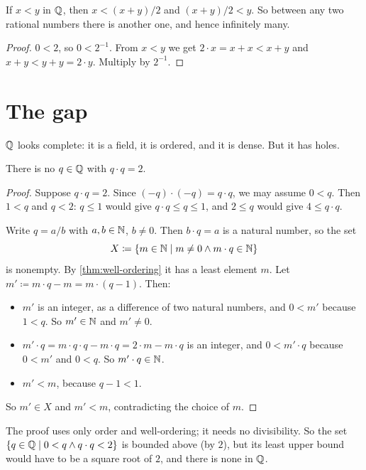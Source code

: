 \begin{theorem}[Density]
\label{thm:density}
If $x < y$ in $\mathbb{Q}$, then $x < (x + y) / 2$ and $(x + y) / 2 < y$. So between any two
rational numbers there is another one, and hence infinitely many.
\end{theorem}

\begin{proof}
$0 < 2$, so $0 < 2^{-1}$. From $x < y$ we get $2 \cdot x = x + x < x + y$ and $x + y
< y + y = 2 \cdot y$. Multiply by $2^{-1}$.
\end{proof}

\section{The gap}

$\mathbb{Q}$ looks complete: it is a field, it is ordered, and it is dense. But it has
holes.

\begin{theorem}
\label{thm:sqrt2}
There is no $q \in \mathbb{Q}$ with $q \cdot q = 2$.
\end{theorem}

\begin{proof}
Suppose $q \cdot q = 2$. Since $(-q) \cdot (-q) = q \cdot q$, we may assume $0 <
q$. Then $1 < q$ and $q < 2$: $q \le 1$ would give $q \cdot q \le q \le 1$, and $2
\le q$ would give $4 \le q \cdot q$.

Write $q = a / b$ with $a, b \in \mathbb{N}$, $b \neq 0$. Then $b \cdot q = a$ is a natural
number, so the set
\[
  X \coloneqq \lbrace m \in \mathbb{N} \mid m \neq 0 \land m \cdot q \in \mathbb{N} \rbrace
\]
is nonempty. By \cref{thm:well-ordering} it has a least element $m$. Let $m'
\coloneqq m \cdot q - m = m \cdot (q - 1)$. Then:
\begin{itemize}
  \item $m'$ is an integer, as a difference of two natural numbers, and $0 < m'$
    because $1 < q$. So $m' \in \mathbb{N}$ and $m' \neq 0$.
  \item $m' \cdot q = m \cdot q \cdot q - m \cdot q = 2 \cdot m - m \cdot q$ is an
    integer, and $0 < m' \cdot q$ because $0 < m'$ and $0 < q$. So $m' \cdot q \in
    \mathbb{N}$.
  \item $m' < m$, because $q - 1 < 1$.
\end{itemize}
So $m' \in X$ and $m' < m$, contradicting the choice of $m$.
\end{proof}

The proof uses only order and well-ordering; it needs no divisibility. So the set
$\lbrace q \in \mathbb{Q} \mid 0 < q \land q \cdot q < 2 \rbrace$ is bounded above (by $2$), but its
least upper bound would have to be a square root of $2$, and there is none in $\mathbb{Q}$.

